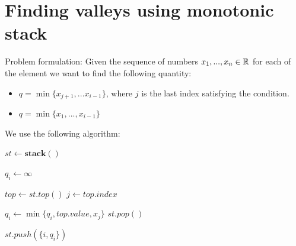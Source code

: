 \section{Finding valleys using monotonic stack}
Problem formulation:
Given the sequence of numbers $x_1, ..., x_n \in \mathbb{R}$ for each of the element we want to find the following quantity:
\begin{itemize}[align = left]
    \item[``$\exists j < i: x_j > x_i$'':] $q = \min \{x_{j+1}, ... x_{i-1}\}$, where $j$ is the last index satisfying the condition.
    \item[``$\nexists j < i: x_j > x_i$'':] $q = \min \{x_1, ..., x_{i-1}\}$
\end{itemize}

We use the following algorithm:
\begin{algorithm}[!htpb]
    \caption{Finding valleys} \label{alg:find valleys}
    $st \gets \textbf{stack}()$\;
    {
        $q_i \gets \infty$\;

        {
            $top \gets st.top()$\;
            $j \gets top.index$\;


            $q_i \gets \min\{q_i, top.value, x_j\}$\;
            $st.pop()$\;
        }

        $st.push(\{i, q_i\})$\;
    }
\end{algorithm}
